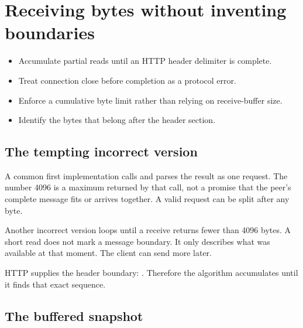 \chapter{Receiving bytes without inventing boundaries}

\begin{objectives}
\begin{itemize}
  \item Accumulate partial reads until an HTTP header delimiter is complete.
  \item Treat connection close before completion as a protocol error.
  \item Enforce a cumulative byte limit rather than relying on receive-buffer size.
  \item Identify the bytes that belong after the header section.
\end{itemize}
\end{objectives}

\section{The tempting incorrect version}

A common first implementation calls  and parses the result as
one request. The number 4096 is a maximum returned by that call, not a promise
that the peer's complete message fits or arrives together. A valid request can
be split after any byte.

Another incorrect version loops until a receive returns fewer than 4096 bytes.
A short read does not mark a message boundary. It only describes what was
available at that moment. The client can send more later.

HTTP supplies the header boundary: . Therefore the
algorithm accumulates until it finds that exact sequence.

\section{The buffered snapshot}


